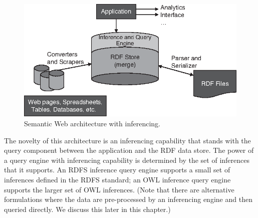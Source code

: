 \begin{figure}
\centering
\includegraphics[width=5in]{media/ch7/f07-01.eps}
\caption{Semantic Web architecture with inferencing.}
\label{fig:ch7.1}
\end{figure}

The novelty of this architecture is an inferencing capability that
stands with the query component between the application and the RDF data
store. The power of a query engine with inferencing capability is
determined by the set of inferences that it supports. An RDFS inference
query engine supports a small set of inferences defined in the RDFS
standard; an OWL inference query engine supports the larger set of OWL
inferences. (Note that there are alternative formulations where the data
are pre-processed by an inferencing engine and then queried directly. We
discuss this later in this chapter.)

